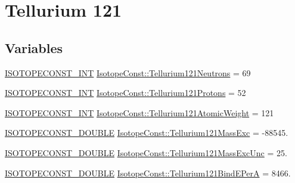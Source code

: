 \hypertarget{group___isotope_const-_tellurium-_te121}{}\section{Tellurium 121}
\label{group___isotope_const-_tellurium-_te121}
\subsection*{Variables}
\begin{DoxyCompactItemize}
\item 
\mbox{\hyperlink{group___isotope_const-_macros_ga5f18360b3e99483a35c32d789e62621c}{I\+S\+O\+T\+O\+P\+E\+C\+O\+N\+S\+T\+\_\+\+I\+NT}} \mbox{\hyperlink{group___isotope_const-_tellurium-_te121_ga8fa00503f9c9d3738cf830b85e46350e}{Isotope\+Const\+::\+Tellurium121\+Neutrons}} = 69
\item 
\mbox{\hyperlink{group___isotope_const-_macros_ga5f18360b3e99483a35c32d789e62621c}{I\+S\+O\+T\+O\+P\+E\+C\+O\+N\+S\+T\+\_\+\+I\+NT}} \mbox{\hyperlink{group___isotope_const-_tellurium-_te121_ga7be3a0b2db304c4277f45dd8f17bd517}{Isotope\+Const\+::\+Tellurium121\+Protons}} = 52
\item 
\mbox{\hyperlink{group___isotope_const-_macros_ga5f18360b3e99483a35c32d789e62621c}{I\+S\+O\+T\+O\+P\+E\+C\+O\+N\+S\+T\+\_\+\+I\+NT}} \mbox{\hyperlink{group___isotope_const-_tellurium-_te121_gac55bd6727f4e2d2c7fa54372b7866b83}{Isotope\+Const\+::\+Tellurium121\+Atomic\+Weight}} = 121
\item 
\mbox{\hyperlink{group___isotope_const-_macros_ga8f45a7272ce02c0b4c65c44636ed719a}{I\+S\+O\+T\+O\+P\+E\+C\+O\+N\+S\+T\+\_\+\+D\+O\+U\+B\+LE}} \mbox{\hyperlink{group___isotope_const-_tellurium-_te121_ga5c412db4b0e97ef2ce386bb451e84194}{Isotope\+Const\+::\+Tellurium121\+Mass\+Exc}} = -\/88545.
\item 
\mbox{\hyperlink{group___isotope_const-_macros_ga8f45a7272ce02c0b4c65c44636ed719a}{I\+S\+O\+T\+O\+P\+E\+C\+O\+N\+S\+T\+\_\+\+D\+O\+U\+B\+LE}} \mbox{\hyperlink{group___isotope_const-_tellurium-_te121_ga6386486f13406a229c0c25a98fd936c8}{Isotope\+Const\+::\+Tellurium121\+Mass\+Exc\+Unc}} = 25.
\item 
\mbox{\hyperlink{group___isotope_const-_macros_ga8f45a7272ce02c0b4c65c44636ed719a}{I\+S\+O\+T\+O\+P\+E\+C\+O\+N\+S\+T\+\_\+\+D\+O\+U\+B\+LE}} \mbox{\hyperlink{group___isotope_const-_tellurium-_te121_ga5b3c3e6316a764ef831275e05c91d512}{Isotope\+Const\+::\+Tellurium121\+Bind\+E\+PerA}} = 8466.
\item 

\end{DoxyCompactItemize}
